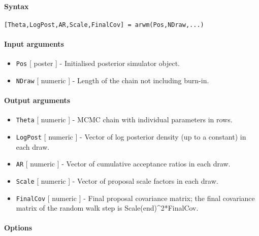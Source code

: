 


	\paragraph{Syntax}\label{syntax}

\begin{verbatim}
[Theta,LogPost,AR,Scale,FinalCov] = arwm(Pos,NDraw,...)
\end{verbatim}

\paragraph{Input arguments}\label{input-arguments}

\begin{itemize}
\item
  \texttt{Pos} {[} poster {]} - Initialised posterior simulator object.
\item
  \texttt{NDraw} {[} numeric {]} - Length of the chain not including
  burn-in.
\end{itemize}

\paragraph{Output arguments}\label{output-arguments}

\begin{itemize}
\item
  \texttt{Theta} {[} numeric {]} - MCMC chain with individual parameters
  in rows.
\item
  \texttt{LogPost} {[} numeric {]} - Vector of log posterior density (up
  to a constant) in each draw.
\item
  \texttt{AR} {[} numeric {]} - Vector of cumulative acceptance ratios
  in each draw.
\item
  \texttt{Scale} {[} numeric {]} - Vector of proposal scale factors in
  each draw.
\item
  \texttt{FinalCov} {[} numeric {]} - Final proposal covariance matrix;
  the final covariance matrix of the random walk step is
  Scale(end)\^{}2*FinalCov.
\end{itemize}

\paragraph{Options}\label{options}

